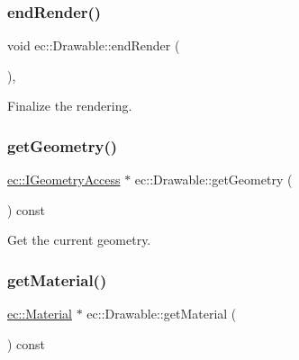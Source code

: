 \mbox{\label{classec_1_1_drawable_abf99119cd72054a55d91a7605aa62e32}} 
\subsubsection{\texorpdfstring{end\+Render()}{endRender()}}
{\footnotesize\ttfamily void ec\+::\+Drawable\+::end\+Render (\begin{DoxyParamCaption}{ }\end{DoxyParamCaption})\hspace{0.3cm}{\ttfamily [protected]}, {\ttfamily [virtual]}}



Finalize the rendering. 

\mbox{\label{classec_1_1_drawable_a49a90aac40736ff3c182196c2b86c2f3}} 
\subsubsection{\texorpdfstring{get\+Geometry()}{getGeometry()}}
{\footnotesize\ttfamily \mbox{\hyperlink{classec_1_1_i_geometry_access}{ec\+::\+I\+Geometry\+Access}} $\ast$ ec\+::\+Drawable\+::get\+Geometry (\begin{DoxyParamCaption}{ }\end{DoxyParamCaption}) const}



Get the current geometry. 

\mbox{\label{classec_1_1_drawable_ac74210aca5428bedbf8af7abe9adbcc1}} 
\subsubsection{\texorpdfstring{get\+Material()}{getMaterial()}}
{\footnotesize\ttfamily \mbox{\hyperlink{classec_1_1_material}{ec\+::\+Material}} $\ast$ ec\+::\+Drawable\+::get\+Material (\begin{DoxyParamCaption}{ }\end{DoxyParamCaption}) const}




